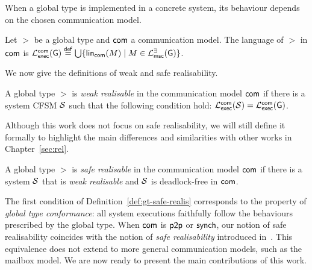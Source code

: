 
When a global type is implemented in a concrete system,
its behaviour depends on the chosen communication model.

\bigskip

\begin{definition}\label{def:global-type-language}
    Let $\gt$ be a global type and $\mathsf{com}$ a communication model. 
    The language of $\gt$ in $\mathsf{com}$ is $
    \mathcal{L}_{\mathsf{exec}}^{\mathsf{com}}(\mathsf{G})\stackrel{\mathsf{def}}{=}
    \bigcup\{\mathsf{lin}_{\mathsf{com}}(M)\mid M\in\mathcal{L}_{\mathsf{msc}}^{\exists}(\mathsf{G})\}$.
\end{definition}

We now give the definitions of weak and safe realisability.

\bigskip

\begin{definition}\label{def:gt-weak-realis}
A global type $\gt$ is \emph{weak realisable} in the
communication model $\mathsf{com}$ if there is a
system CFSM $\mathcal{S}$ such that the following condition hold:
$\mathcal{L}_{\mathsf{exec}}^{\mathsf{com}}(\mathcal{S}) =
\mathcal{L}_{\mathsf{exec}}^{\mathsf{com}}(\mathsf{G})$.
\end{definition}

Although this work does not focus on safe realisability, we will still
define it formally to highlight the main differences and similarities 
with other works in Chapter~\ref{sec:rel}.

\bigskip

\begin{definition}\label{def:gt-safe-realis}
    A global type $\gt$ is \emph{safe realisable}
    in the communication model $\mathsf{com}$
    if there is a system $\mathcal{S}$ that is \emph{weak realisable} and  
    $\mathcal{S}$ is deadlock-free in $\mathsf{com}$.
\end{definition}

The first condition of Definition~\ref{def:gt-safe-realis} corresponds to  
the property of \emph{global type conformance}: all system executions 
faithfully follow the behaviours prescribed by the global type.
When $\mathsf{com}$ is $\mathsf{p2p}$ or $\mathsf{synch}$, 
our notion of safe realisability coincides with the notion of 
\emph{safe realisability} introduced in~\cite{alur2005realizability}.
This equivalence does not extend to more general communication models, 
such as the mailbox model.
We are now ready to present the main contributions of this work.
